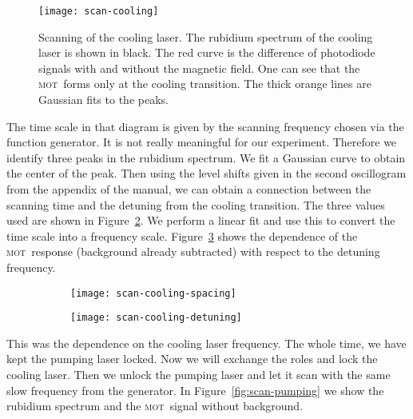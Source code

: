 \documentclass[11pt, english, fleqn, DIV=15, headinclude, BCOR=2cm]{scrreprt}
\newcommand\mot{\textsc{mot}}
\begin{document}

\begin{figure}
    \centering
    \texttt{[image: scan-cooling]}
    \caption{%
        Scanning of the cooling laser. The rubidium spectrum of the cooling
        laser is shown in black. The red curve is the difference of photodiode
        signals with and without the magnetic field. One can see that the \mot\
        forms only at the cooling transition. The thick orange lines are
        Gaussian fits to the peaks.
    }
    \label{fig:scan-cooling}
\end{figure}

The time scale in that diagram is given by the scanning frequency chosen via
the function generator. It is not really meaningful for our experiment.
Therefore we identify three peaks in the rubidium spectrum. We fit a Gaussian
curve to obtain the center of the peak. Then using the level shifts given in
the second oscillogram from the appendix of the manual, we can obtain a
connection between the scanning time and the detuning from the cooling
transition. The three values used are shown in
Figure~\ref{fig:scan-cooling-spacing}. We perform a linear fit and use this to
convert the time scale into a frequency scale.
Figure~\ref{fig:scan-cooling-detuning} shows the dependence of the \mot\
response (background already subtracted) with respect to the detuning
frequency.

\begin{figure}
    \centering
    \begin{subfigure}[c]{0.48\linewidth}
        \centering
        \texttt{[image: scan-cooling-spacing]}
        \caption{%
            }
        \label{fig:scan-cooling-spacing}
    \end{subfigure}
    \hfill
    \begin{subfigure}[c]{0.48\linewidth}
        \centering
        \texttt{[image: scan-cooling-detuning]}
        \caption{%
            }
        \label{fig:scan-cooling-detuning}
    \end{subfigure}
    \caption{%
        }
    \label{fig:}
\end{figure}

This was the dependence on the cooling laser frequency. The whole time, we have
kept the pumping laser locked. Now we will exchange the roles and lock the
cooling laser. Then we unlock the pumping laser and let it scan with the same
slow frequency from the generator. In Figure~\ref{fig:scan-pumping} we show the
rubidium spectrum and the \mot\ signal without background.
\end{document}
